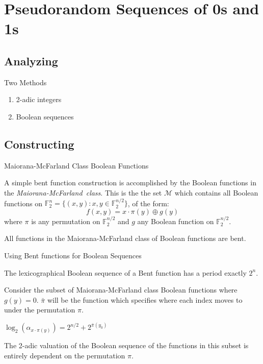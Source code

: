 \documentclass{beamer}
\def\gftwo{\mathbb{F}_2}
\begin{document}
\section{Pseudorandom Sequences of 0s and 1s}
\subsection{Analyzing}
\begin{frame}{Two Methods}
  \begin{enumerate}[1.]
    \item 2-adic integers
    \item Boolean sequences
  \end{enumerate}
\end{frame}

\subsection{Constructing}
\begin{frame}{Maiorana-McFarland Class Boolean Functions}
  \par A simple bent function construction is accomplished by the Boolean
  functions in the {\em Maiorana-McFarland\ class}. This is the the set
  $\mathcal{M}$ which contains all Boolean functions on
  $\gftwo^n=\{(x,y):x,y\in\gftwo^{n/2}\}$, of the form:
    \[
    f(x,y)=x\cdot\pi(y)\oplus g(y)
    \]
  where $\pi$ is any permutation on $\gftwo^{n/2}$ and $g$ any Boolean
  function on $\gftwo^{n/2}$.\\
  
  \par All functions in the Maiorana-McFarland class of Boolean functions are
  bent.
\end{frame}
  
\begin{frame}{Using Bent functions for Boolean Sequences}
  \begin{theorem}
    The lexicographical Boolean sequence of a Bent function has a period
    exactly $2^n$.
  \end{theorem}
\end{frame}

\begin{frame}
  \par Consider the subset of Maiorana-McFarland class Boolean functions where
  $g(y)=0$. $\bar{\pi}$ will be the function which specifies where each
  index moves to under the permutation $\pi$.
  
  \begin{theorem}
    $\log_2(\alpha_{x\cdot\pi(y)})=2^{n/2}+2^{\bar{\pi}(y_0)}$
  \end{theorem}

  \par The 2-adic valuation of the Boolean sequence of the functions in this
  subset is entirely dependent on the permutation $\pi$.
\end{frame}
\end{document}
